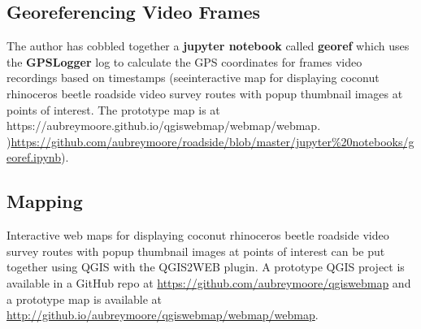 \documentclass[12pt,letterpaper,english,bibliography=totocnumbered, abstract=on]{scrartcl}
\begin{document}
\subsection{Georeferencing Video Frames}

The author has cobbled together a \textbf{jupyter notebook} called \textbf{georef} which uses the \textbf{GPSLogger} log to calculate the GPS coordinates for frames video recordings based on timestamps (seeinteractive map for displaying coconut rhinoceros beetle roadside video survey routes with popup thumbnail images at points of interest. The prototype map is at https://aubreymoore.github.io/qgiswebmap/webmap/webmap. )\url{https://github.com/aubreymoore/roadside/blob/master/jupyter%20notebooks/georef.ipynb}). 
	
\subsection{Mapping}

Interactive web maps for displaying coconut rhinoceros beetle roadside video survey routes with popup thumbnail images at points of interest can be put together using QGIS with the QGIS2WEB plugin. A prototype QGIS project is available in a GitHub repo at \url{https://github.com/aubreymoore/qgiswebmap} and a prototype map is available at \url{http://github.io/aubreymoore/qgiswebmap/webmap/webmap}.

\printbibliography	
\end{document}

